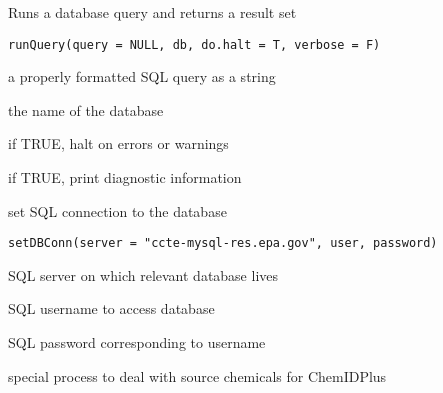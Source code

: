 \documentclass[letterpaper]{book}
\begin{document}
%
\begin{Description}\relax
Runs a database query and returns a result set
\end{Description}
%
\begin{Usage}
\begin{verbatim}
runQuery(query = NULL, db, do.halt = T, verbose = F)
\end{verbatim}
\end{Usage}
%
\begin{Arguments}
\begin{ldescription}
\item[\code{query}] a properly formatted SQL query as a string

\item[\code{db}] the name of the database

\item[\code{do.halt}] if TRUE, halt on errors or warnings

\item[\code{verbose}] if TRUE, print diagnostic information
\end{ldescription}
\end{Arguments}
%
\begin{Description}\relax
set SQL connection to the database
\end{Description}
%
\begin{Usage}
\begin{verbatim}
setDBConn(server = "ccte-mysql-res.epa.gov", user, password)
\end{verbatim}
\end{Usage}
%
\begin{Arguments}
\begin{ldescription}
\item[\code{server}] SQL server on which relevant database lives

\item[\code{user}] SQL username to access database

\item[\code{password}] SQL password corresponding to username
\end{ldescription}
\end{Arguments}
%
\begin{Description}\relax
special process to deal with source chemicals for ChemIDPlus
\end{Description}
\end{document}
